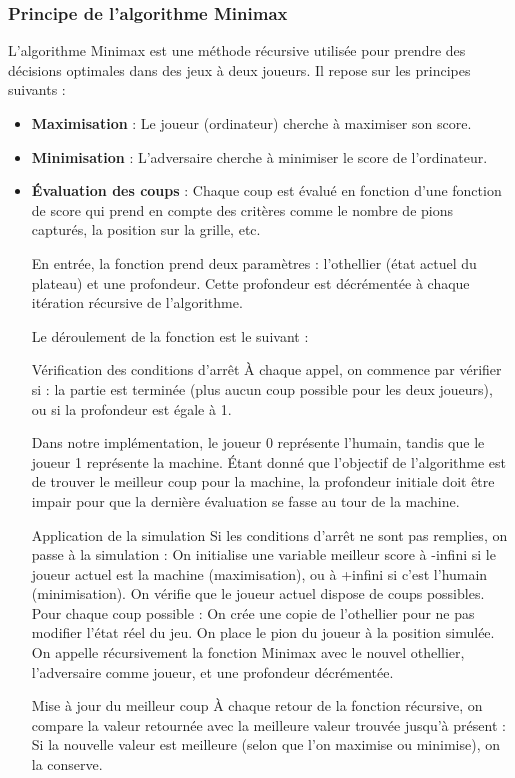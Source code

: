 \documentclass[a4paper,12pt]{article}
\begin{document}
\subsubsection{Principe de l'algorithme Minimax}
L'algorithme Minimax est une méthode récursive utilisée pour prendre des décisions optimales dans des jeux à deux joueurs. Il repose sur les principes suivants :
\begin{itemize}
    \item \textbf{Maximisation} : Le joueur (ordinateur) cherche à maximiser son score.
    \item \textbf{Minimisation} : L'adversaire cherche à minimiser le score de l'ordinateur.
    \item \textbf{Évaluation des coups} : Chaque coup est évalué en fonction d'une fonction de score qui prend en compte des critères comme le nombre de pions capturés, la position sur la grille, etc.


En entrée, la fonction prend deux paramètres : l’othellier (état actuel du plateau) et une profondeur. Cette profondeur est décrémentée à chaque itération récursive de l’algorithme.

Le déroulement de la fonction est le suivant :

Vérification des conditions d’arrêt
À chaque appel, on commence par vérifier si :
la partie est terminée (plus aucun coup possible pour les deux joueurs),
ou si la profondeur est égale à 1.

   Dans notre implémentation, le joueur 0 représente l’humain, tandis que le joueur 1 représente la machine. Étant donné que l’objectif de l’algorithme est de trouver le meilleur coup pour la machine, la profondeur initiale doit être impair pour que la dernière évaluation se fasse au tour de la machine.

Application de la simulation
Si les conditions d’arrêt ne sont pas remplies, on passe à la simulation :
On initialise une variable meilleur score à -infini si le joueur actuel est la machine (maximisation), ou à +infini si c’est l’humain (minimisation).
On vérifie que le joueur actuel dispose de coups possibles.
Pour chaque coup possible :
On crée une copie de l’othellier pour ne pas modifier l’état réel du jeu.
On place le pion du joueur à la position simulée.
On appelle récursivement la fonction Minimax avec le nouvel othellier, l’adversaire comme joueur, et une profondeur décrémentée.

Mise à jour du meilleur coup
À chaque retour de la fonction récursive, on compare la valeur retournée avec la meilleure valeur trouvée jusqu’à présent :
Si la nouvelle valeur est meilleure (selon que l’on maximise ou minimise), on la conserve.


\end{itemize}
\end{document}

